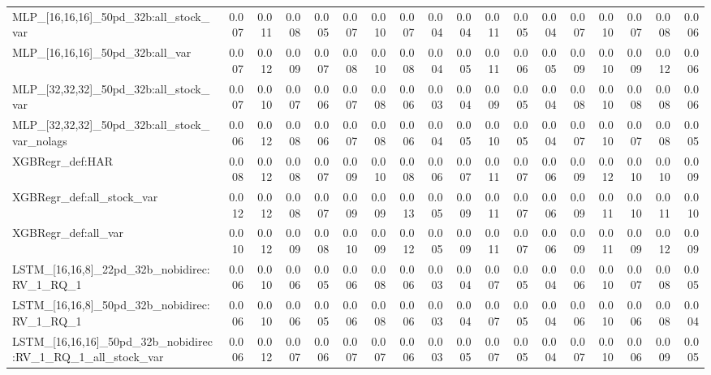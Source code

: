 \begin{tabular}{lrrrrrrrrrrrrrrrrr}
MLP\_[16,16,16]\_50pd\_32b:all\_stock\_var & 0.007 & 0.011 & 0.008 & 0.005 & 0.007 & 0.010 & 0.007 & 0.004 & 0.004 & 0.011 & 0.005 & 0.004 & 0.007 & 0.010 & 0.007 & 0.008 & 0.006 \\
MLP\_[16,16,16]\_50pd\_32b:all\_var & 0.007 & 0.012 & 0.009 & 0.007 & 0.008 & 0.010 & 0.008 & 0.004 & 0.005 & 0.011 & 0.006 & 0.005 & 0.009 & 0.010 & 0.009 & 0.012 & 0.006 \\
MLP\_[32,32,32]\_50pd\_32b:all\_stock\_var & 0.007 & 0.010 & 0.007 & 0.006 & 0.007 & 0.008 & 0.006 & 0.003 & 0.004 & 0.009 & 0.005 & 0.004 & 0.008 & 0.010 & 0.008 & 0.008 & 0.006 \\
MLP\_[32,32,32]\_50pd\_32b:all\_stock\_var\_nolags & 0.006 & 0.012 & 0.008 & 0.006 & 0.007 & 0.008 & 0.006 & 0.004 & 0.005 & 0.010 & 0.005 & 0.004 & 0.007 & 0.010 & 0.007 & 0.008 & 0.005 \\
XGBRegr\_def:HAR & 0.008 & 0.012 & 0.008 & 0.007 & 0.009 & 0.010 & 0.008 & 0.006 & 0.007 & 0.011 & 0.007 & 0.006 & 0.009 & 0.012 & 0.010 & 0.010 & 0.009 \\
XGBRegr\_def:all\_stock\_var & 0.012 & 0.012 & 0.008 & 0.007 & 0.009 & 0.009 & 0.013 & 0.005 & 0.009 & 0.011 & 0.007 & 0.006 & 0.009 & 0.011 & 0.010 & 0.011 & 0.010 \\
XGBRegr\_def:all\_var & 0.010 & 0.012 & 0.009 & 0.008 & 0.010 & 0.009 & 0.012 & 0.005 & 0.009 & 0.011 & 0.007 & 0.006 & 0.009 & 0.011 & 0.009 & 0.012 & 0.009 \\
LSTM\_[16,16,8]\_22pd\_32b\_nobidirec:RV\_1\_RQ\_1 & 0.006 & 0.010 & 0.006 & 0.005 & 0.006 & 0.008 & 0.006 & 0.003 & 0.004 & 0.007 & 0.005 & 0.004 & 0.006 & 0.010 & 0.007 & 0.008 & 0.005 \\
LSTM\_[16,16,8]\_50pd\_32b\_nobidirec:RV\_1\_RQ\_1 & 0.006 & 0.010 & 0.006 & 0.005 & 0.006 & 0.008 & 0.006 & 0.003 & 0.004 & 0.007 & 0.005 & 0.004 & 0.006 & 0.010 & 0.006 & 0.008 & 0.004 \\
LSTM\_[16,16,16]\_50pd\_32b\_nobidirec:RV\_1\_RQ\_1\_all\_stock\_var & 0.006 & 0.012 & 0.007 & 0.006 & 0.007 & 0.007 & 0.006 & 0.003 & 0.005 & 0.007 & 0.005 & 0.004 & 0.007 & 0.010 & 0.006 & 0.009 & 0.005 \\
\bottomrule
\end{tabular}
